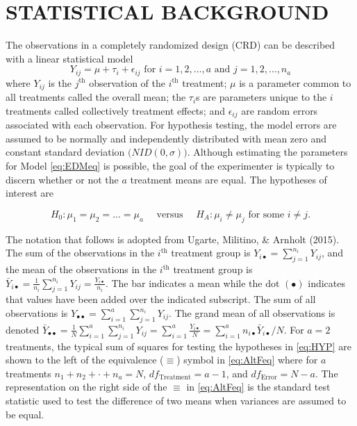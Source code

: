 \documentclass[
]{article}
\begin{document}
\section*{STATISTICAL BACKGROUND}\label{statistical-background}

The observations in a completely randomized design (CRD) can be described with a linear statistical model
\begin{equation}
Y_{ij} = \mu + \tau_i + \epsilon_{ij} \text{ for }i=1, 2, \dots, a \text{ and } j
=1, 2, \dots, n_a
\label{eq:EDMeq}
\end{equation}
where \(Y_{ij}\) is the \(j^\text{th}\)
observation of the \(i^\text{th}\) treatment; \(\mu\) is a parameter common to all treatments called the overall mean; the \(\tau_i\)s are parameters unique to the \(i\) treatments called collectively treatment effects; and \(\epsilon_{ij}\) are random errors associated with each observation. For hypothesis testing, the model errors are assumed to be normally and independently distributed with mean zero and constant standard deviation \(\bigl(NID(0, \sigma)\bigr)\). Although estimating the parameters for Model \eqref{eq:EDMeq} is possible, the goal of the experimenter is typically to discern whether or not the \(a\) treatment means are equal. The hypotheses of interest are

\begin{equation}
H_0: \mu_1=\mu_2= \dots = \mu_a\quad\text{ versus }\quad H_A:\mu_i \ne \mu_j \text{ for some }i \neq j.
\label{eq:HYP}
\end{equation}

The notation that follows is adopted from Ugarte, Militino, \& Arnholt (2015). The sum of the observations in the \(i^\text{th}\) treatment group is \(Y_{i\bullet}=\sum_{j=1}^{n_i} Y_{ij}\), and the mean of the observations in the \(i^\text{th}\) treatment group is \(\bar{Y}_{i\bullet}=\frac{1}{n_{i}}\sum_{j=1}^{n_i} Y_{ij} = \frac{Y_{i\bullet}}{n_i}\). The bar indicates a mean while the dot \((\bullet)\) indicates that values have been added over the indicated subscript. The sum of all observations is \(Y_{\bullet\bullet}=\sum_{i=1}^a \sum_{j=1}^{n_i}Y_{ij}.\) The grand mean of all observations is denoted \(\bar{Y}_{\bullet\bullet}=\frac{1}{N}\sum_{i=1}^a \sum_{j=1}^{n_i}Y_{ij}=\sum_{i=1}^{a}\frac{Y_{i\bullet}}{N}   =\sum_{i=1}^{a}n_{i\bullet}\bar{Y}_{i\bullet}/N.\) For \(a = 2\) treatments, the typical sum of squares for testing the hypotheses in \eqref{eq:HYP} are shown to the left of the equivalence (\(\equiv\)) symbol in \eqref{eq:AltFeq} where for \(a\) treatments \(n_1 + n_2 + \cdot + n_a = N\), \(df_{\text{Treatment}} = a - 1\), and \(df_{\text{Error}} = N-a\). The representation on the right side of the \(\equiv\) in \eqref{eq:AltFeq} is the standard test statistic used to test the difference of two means when variances are assumed to be equal.
\end{document}
